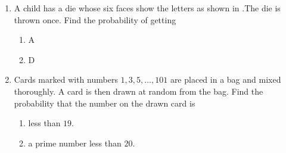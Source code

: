 \begin{enumerate}
\item A child has a die whose six faces show the letters as shown in .The die is thrown once. Find the probability of getting 
\begin{figure}[ht]
\centering
{}
\caption{}
\label{2012_p_fig1}
\end{figure}
\begin{enumerate}[label=\Roman*.]
\item A 
\item D 
\end{enumerate}
\item Cards marked with numbers $1,3,5, \ldots, 101$ are placed in a bag and mixed thoroughly. A card is then drawn at random from the bag. Find the probability that the number on the drawn card is 
\begin{enumerate}[label=\Roman*.]
\item less than $19$.
\item a prime number less than $20$. 
\end{enumerate}
\end{enumerate}
